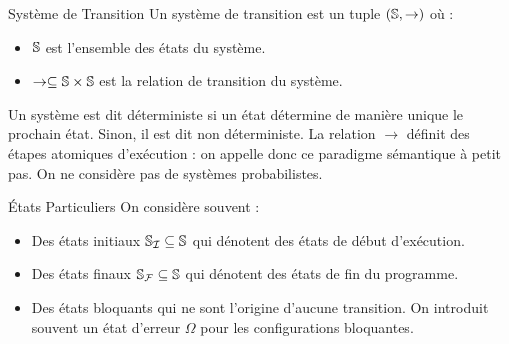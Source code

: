 \documentclass{cours}
\begin{document}
\begin{définition}{Système de Transition}{}
Un système de transition est un tuple $\left(\S, \rightarrow\right)$ où :
\begin{itemize}
	\item $\S$ est l'ensemble des états du système.
	\item $\rightarrow \subseteq \S \times \S$ est la relation de transition du système.
\end{itemize}
\end{définition}

Un système est dit déterministe si un état détermine de manière unique le prochain état. Sinon, il est dit non déterministe. La relation $\rightarrow$ définit des étapes atomiques d'exécution : on appelle donc ce paradigme sémantique à petit pas. On ne considère pas de systèmes probabilistes.
\begin{définition}{États Particuliers}{}
On considère souvent :
\begin{itemize}
	\item Des états initiaux $\S_{\mI} \subseteq \S$ qui dénotent des états de début d'exécution.
	\item Des états finaux $\S_{\mF} \subseteq \S$ qui dénotent des états de fin du programme.
	\item Des états bloquants qui ne sont l'origine d'aucune transition. On introduit souvent un état d'erreur $\Omega$ pour les configurations bloquantes.
\end{itemize}
\end{définition}
\end{document}
